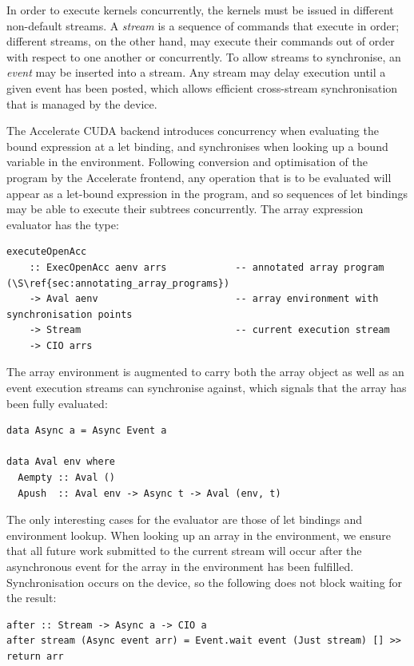 In order to execute kernels concurrently, the kernels must be issued in
different non-default streams. A \emph{stream}\cuda[stream]{} is a sequence of
commands that execute in order; different streams, on the other hand, may
execute their commands out of order with respect to one another or concurrently.
To allow streams to synchronise, an \emph{event}\cuda[event]{} may be inserted
into a stream. Any stream may delay execution until a given event has been
posted, which allows efficient cross-stream synchronisation that is managed by
the device.

The Accelerate CUDA backend introduces concurrency when evaluating the bound
expression at a let binding, and synchronises when looking up a bound variable
in the environment. Following conversion and optimisation of the program by the
Accelerate frontend, any operation that is to be evaluated will appear as a
let-bound expression in the program, and so sequences of let bindings may be
able to execute their subtrees concurrently. The array expression evaluator has
the type:
%
\begin{lstlisting}[style=haskell]
executeOpenAcc
    :: ExecOpenAcc aenv arrs            -- annotated array program (\S\ref{sec:annotating_array_programs})
    -> Aval aenv                        -- array environment with synchronisation points
    -> Stream                           -- current execution stream
    -> CIO arrs
\end{lstlisting}
%
The array environment is augmented to carry both the array object as well as an
event execution streams can synchronise against, which signals that the array
has been fully evaluated:
%
\begin{lstlisting}[style=haskell]
data Async a = Async Event a

data Aval env where
  Aempty :: Aval ()
  Apush  :: Aval env -> Async t -> Aval (env, t)
\end{lstlisting}

The only interesting cases for the evaluator are those of let bindings and
environment lookup. When looking up an array in the environment, we ensure that
all future work submitted to the current stream will occur after the
asynchronous event for the array in the environment has been fulfilled.
Synchronisation occurs on the device, so the following does not block waiting
for the result:
%
\begin{lstlisting}[style=haskell]
after :: Stream -> Async a -> CIO a
after stream (Async event arr) = Event.wait event (Just stream) [] >> return arr
\end{lstlisting}

